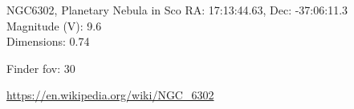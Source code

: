 \begin{block}{NGC6302, Planetary Nebula in Sco}
    RA: 17:13:44.63, Dec: -37:06:11.3 \\ 
    Magnitude (V): 9.6 \\ 
    Dimensions: 0.74 

    Finder fov: 30 

    \url{https://en.wikipedia.org/wiki/NGC_6302} 
\end{block}